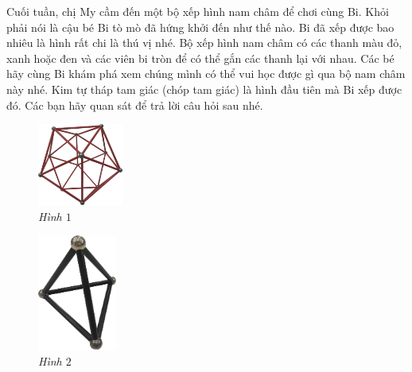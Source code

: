 \newpage
\graphicspath{{../choicungbi/boxephinh/}}
\begingroup
{} 
\centering
\endgroup
%
\vspace*{15pt}
	\begin{multicols}{2}
		Cuối tuần, chị My cầm đến một bộ xếp hình nam châm để chơi cùng Bi. Khỏi phải nói là cậu bé Bi tò mò đã hứng khởi đến như thế nào. Bi đã xếp được bao nhiêu là hình rất chi là thú vị nhé.
		\vskip 0.1cm
		Bộ xếp hình nam châm có các thanh màu đỏ,  xanh hoặc đen và các viên bi tròn để có thể gắn các thanh lại với nhau.
		\vskip 0.1cm
		Các bé hãy cùng Bi khám phá xem chúng mình có thể vui học được gì qua bộ nam châm này nhé.
		\vskip 0.1cm
		Kim tự tháp tam giác (chóp tam giác) là hình đầu tiên mà Bi xếp được đó. Các bạn hãy quan sát để trả lời câu hỏi sau nhé.
		\begin{figure}[H]
			\centering
			\vspace*{-5pt}
			\captionsetup{labelformat= empty, justification=centering}
			\includegraphics[width=0.25\textwidth]{1}
			\caption{\small\textit{Hình $1$}}
			\vspace*{-10pt}
		\end{figure}
		\begin{figure}[H]
			\centering
			\captionsetup{labelformat= empty, justification=centering}
			\includegraphics[width=0.23\textwidth]{2}
			\caption{\small\textit{Hình $2$}}
			\vspace*{-5pt}
		\end{figure}
	\end{multicols}
	
